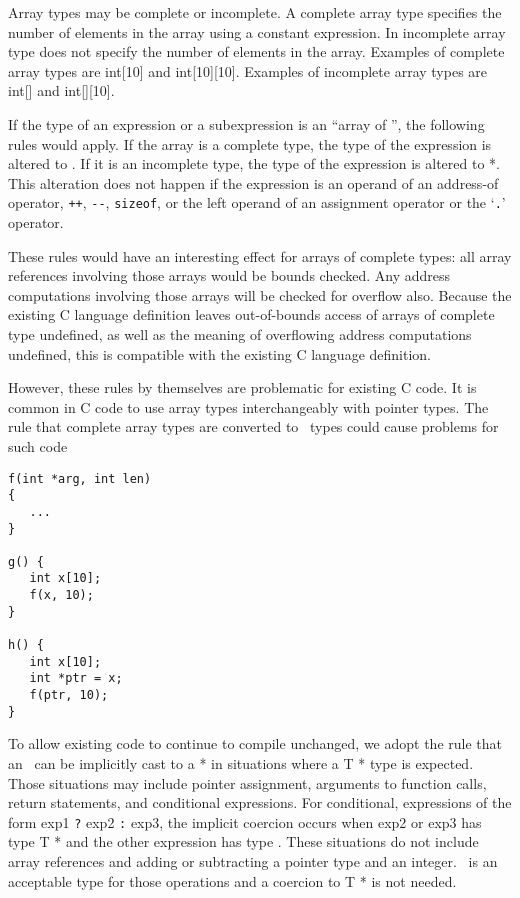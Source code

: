 Array types may be complete or incomplete. A complete array type
specifies the number of elements in the array using a constant
expression. In incomplete array type does not specify the number of
elements in the array. Examples of complete array types are int[10]
and int[10][10]. Examples of incomplete array types are
int[] and int[][10].

If the type of an expression or a subexpression is an ``array of
'', the following rules would apply. If the array is a complete
type, the type of the expression is altered to
\arrayptrT . If it is
an incomplete type, the type of the expression is altered to  *.
This alteration does not happen if the expression is an operand of an
address-of operator, \texttt{++}, \texttt{-\/-}, \texttt{sizeof}, or the
left operand of an assignment operator or the `\texttt{.}' operator.

These rules would have an interesting effect for arrays of complete
types: all array references involving those arrays would be bounds
checked. Any address computations involving those arrays will be checked
for overflow also. Because the existing C language definition leaves
out-of-bounds access of arrays of complete type undefined, as well as
the meaning of overflowing address computations undefined, this is
compatible with the existing C language definition.

However, these rules by themselves are problematic for existing C code.
It is common in C code to use array types interchangeably with pointer
types. The rule that complete array types are converted to
\arrayptr\ types could cause problems for such code

\begin{verbatim}
f(int *arg, int len)
{ 
   ...
}

g() {
   int x[10];
   f(x, 10);
}

h() {
   int x[10];
   int *ptr = x;
   f(ptr, 10);
}
\end{verbatim}

To allow existing code to continue to compile unchanged, we adopt the
rule that an \arrayptrT\ can be
implicitly cast to a  * in situations where a T * type is
expected. Those situations may include pointer assignment, arguments to
function calls, return statements, and conditional expressions. For
conditional, expressions of the form exp1 \texttt{?} exp2 \texttt{:}
exp3, the implicit coercion occurs when exp2 or exp3 has type T * and
the other expression has type
\arrayptrT. These situations do not
include array references and adding or subtracting a pointer type and an
integer. \arrayptrT\ is an acceptable
type for those operations and a coercion to T * is not needed.

